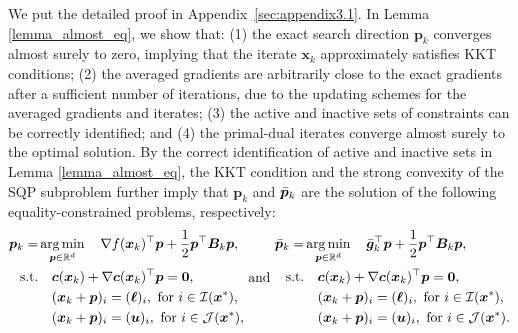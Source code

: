 \documentclass[aos]{imsart}
\numberwithin{equation}{section}
\theoremstyle{plain}
\begin{document}
We put the detailed proof in Appendix~\ref{sec:appendix3.1}. In Lemma \ref{lemma_almost_eq}, we show that: (1) the exact search direction $\bm{p}_k$ converges almost surely to zero, implying that the iterate $\bm{x}_k$ approximately satisfies KKT conditions; (2) the averaged gradients are arbitrarily close to the exact gradients after a sufficient number of iterations, due to the updating schemes for the averaged gradients and iterates; (3) the active and inactive sets of constraints can be correctly identified; and (4) the primal-dual iterates converge almost surely to the optimal solution.
By the correct identification of active and inactive sets in Lemma \ref{lemma_almost_eq}, 
the KKT condition and the strong convexity of the SQP subproblem further imply that $\bm{p}_k$ and $\Bar{\bm{p}}_k$ are the solution of the following equality-constrained problems, respectively:
   \begin{equation}
      \label{eq9}
       \begin{split}
        \bm{p}_k = & \mathop{\arg \min}_{\bm{p} \in \mathbb{R}^{d}} \hspace{1em}  \nabla f(\bm{x}_k)^{\top}\bm{p}+ \frac{1}{2}\bm{p}^{\top}\bm{B}_k\bm{p},\\
        \text{s.t.} & \hspace{1em} \bm{c}(\bm{x}_k)+\nabla \bm{c}(\bm{x}_k)^{\top}\bm{p} = \bm{0},\\
        & \hspace{1em} (\bm{x}_k + \bm{p})_i = (\bm{\ell})_i,~\text{for}~ i \in \mathcal{I}(\bm{x}^{*}),\\
        & \hspace{1em} (\bm{x}_k + \bm{p})_i = (\bm{u})_i,~\text{for}~ i \in \mathcal{J}(\bm{x}^{*}),
    \end{split}  
    ~\text{and}~
       \begin{split}
        \Bar{\bm{p}}_k = & \mathop{\arg \min}_{\bm{p} \in \mathbb{R}^{d}}  \hspace{1em}  \Bar{\bm{g}}_k^{\top}\bm{p}+ \frac{1}{2}\bm{p}^{\top}\bm{B}_k\bm{p},\\
        \text{s.t.} & \hspace{1em} \bm{c}(\bm{x}_k)+\nabla \bm{c}(\bm{x}_k)^{\top}\bm{p} = \bm{0},\\
        & \hspace{1em} (\bm{x}_k + \bm{p})_i = (\bm{\ell})_i,~\text{for}~ i \in \mathcal{I}(\bm{x}^{*}),\\
        & \hspace{1em} (\bm{x}_k + \bm{p})_i = (\bm{u})_i,~\text{for}~ i \in \mathcal{J}(\bm{x}^{*}).
    \end{split}    
   \end{equation}
\end{document}
